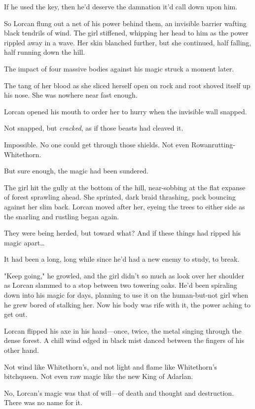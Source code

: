 If he used the key, then he'd deserve the damnation it'd call down upon him.

So Lorcan flung out a net of his power behind them, an invisible barrier wafting black tendrils of wind.
The girl stiffened, whipping her head to him as the power rippled away in a wave.
Her skin blanched further, but she continued, half falling, half running down the hill.

The impact of four massive bodies against his magic struck a moment later.

The tang of her blood as she sliced herself open on rock and root shoved itself up his nose.
She was nowhere near fast enough.

Lorcan opened his mouth to order her to hurry when the invisible wall snapped.

Not snapped, but \emph{cracked}, as if those beasts had cleaved it.

Impossible.
No one could get through those shields.
Not even Rowanrutting-Whitethorn.

But sure enough, the magic had been sundered.

The girl hit the gully at the bottom of the hill, near-sobbing at the flat expanse of forest sprawling ahead.
She sprinted, dark braid thrashing, pack bouncing against her slim back.
Lorcan moved after her, eyeing the trees to either side as the snarling and rustling began again.

They were being herded, but toward what?
And if these things had ripped his magic apart\ldots{}

It had been a long, long while since he'd had a new enemy to study, to break.

"Keep going," he growled, and the girl didn't so much as look over her shoulder as Lorcan slammed to a stop between two towering oaks.
He'd been spiraling down into his magic for days, planning to use it on the human-but-not girl when he grew bored of stalking her.
Now his body was rife with it, the power aching to get out.

Lorcan flipped his axe in his hand---once, twice, the metal singing through the dense forest.
A chill wind edged in black mist danced between the fingers of his other hand.

Not wind like Whitethorn's, and not light and flame like Whitethorn's bitchqueen.
Not even raw magic like the new King of Adarlan.

No, Lorcan's magic was that of will---of death and thought and destruction.
There was no name for it.

